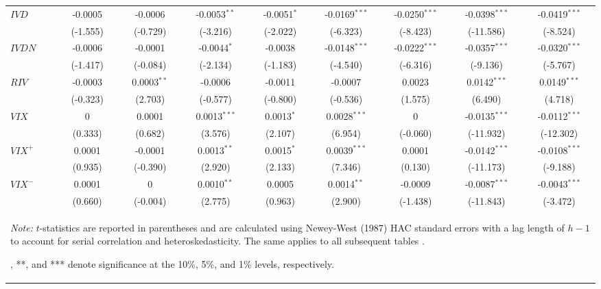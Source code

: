 \documentclass[a4paper, 12pt]{article}    %
\begin{document}
\begin{table}[htbp]
\begin{tabular}{lcccccccc}
$IVD$ &-0.0005 & -0.0006 & -0.0053$^{**}$ & -0.0051$^{*}$ & -0.0169$^{***}$ & -0.0250$^{***}$ & -0.0398$^{***}$ & -0.0419$^{***}$  \\
&(-1.555) & (-0.729) & (-3.216) & (-2.022) & (-6.323) & (-8.423) & (-11.586) & (-8.524) \\
$IVDN$ & -0.0006& -0.0001 & -0.0044$^{*}$ & -0.0038 & -0.0148$^{***}$ & -0.0222$^{***}$ & -0.0357$^{***}$ & -0.0320$^{***}$ \\
&(-1.417) & (-0.084) & (-2.134) & (-1.183) & (-4.540) & (-6.316) & (-9.136) & (-5.767) \\
$RIV$ &-0.0003 & 0.0003$^{**}$ & -0.0006 & -0.0011 & -0.0007 & 0.0023 & 0.0142$^{***}$ & 0.0149$^{***}$  \\
&(-0.323) & (2.703) & (-0.577) & (-0.800) & (-0.536) & (1.575) & (6.490) & (4.718) \\
$VIX$ &0 & 0.0001 & 0.0013$^{***}$ & 0.0013$^{*}$ & 0.0028$^{***}$ & 0 & -0.0135$^{***}$ & -0.0112$^{***}$  \\
&(0.333) & (0.682) & (3.576) & (2.107) & (6.954) & (-0.060) & (-11.932) & (-12.302) \\
$VIX^+$ &0.0001 & -0.0001 & 0.0013$^{**}$ & 0.0015$^{*}$ & 0.0039$^{***}$ & 0.0001 & -0.0142$^{***}$ & -0.0108$^{***}$  \\
&(0.935) & (-0.390) & (2.920) & (2.133) & (7.346) & (0.130) & (-11.173) & (-9.188) \\
$VIX^-$ &0.0001 & 0 & 0.0010$^{**}$ & 0.0005 & 0.0014$^{**}$ & -0.0009 & -0.0087$^{***}$ & -0.0043$^{***}$  \\
&(0.660) & (-0.004) & (2.775) & (0.963) & (2.900) & (-1.438) & (-11.843) & (-3.472) \\
\bottomrule
\multicolumn{9}{p{16cm}}{\scriptsize \textit{Note:} $t$-statistics are reported in parentheses and are calculated using Newey-West (1987) HAC standard errors with a lag length of $h-1$ to account for serial correlation and heteroskedasticity. The same applies to all subsequent tables .\par \smallskip *, **, and *** denote significance at the 10\%, 5\%, and 1\% levels, respectively. } \\
\end{tabular}
\end{table}
\end{document}
